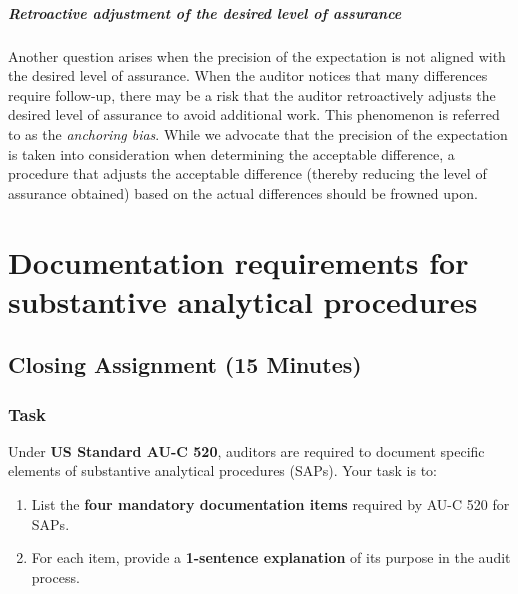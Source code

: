 \documentclass[12pt,a4paper]{memoir}
\begin{document}
\paragraph{Retroactive adjustment of the desired level of assurance} Another question arises when the precision of the expectation is not aligned with the desired level of assurance. When the auditor notices that many differences require follow-up, there may be a risk that the auditor retroactively adjusts the desired level of assurance to avoid additional work. This phenomenon is referred to as the \textit{anchoring bias}. While we advocate that the precision of the expectation is taken into consideration when determining the acceptable difference, a procedure that adjusts the acceptable difference (thereby reducing the level of assurance obtained) based on the actual differences should be frowned upon.

\chapter{Documentation requirements for substantive analytical procedures}

\section*{Closing Assignment (15 Minutes)}

\subsection*{Task}
Under \textbf{US Standard AU-C 520}, auditors are required to document specific elements of substantive analytical procedures (SAPs). Your task is to:

\begin{enumerate}
    \item List the \textbf{four mandatory documentation items} required by AU-C 520 for SAPs.
    \item For each item, provide a \textbf{1-sentence explanation} of its purpose in the audit process.
\end{enumerate}


\end{document}
